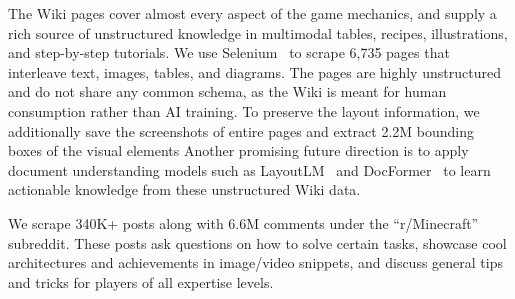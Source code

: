 The Wiki pages cover almost every aspect of the game mechanics, and supply a rich source of unstructured knowledge in multimodal tables, recipes, illustrations, and step-by-step tutorials. We use Selenium~\cite{selenium} to scrape 6,735 pages that interleave text, images, tables, and diagrams. The pages are highly unstructured and do not share any common schema, as the Wiki is meant for human consumption rather than AI training. To preserve the layout information, we additionally save the screenshots of entire pages and extract 2.2M bounding boxes of the visual elements  Another promising future direction is to apply document understanding models such as LayoutLM~\cite{xu2019layoutlm, xu2020layoutlmv2} and DocFormer~\cite{appalaraju2021docformer} to learn actionable knowledge from these unstructured Wiki data.

We scrape 340K+ posts along with 6.6M comments under the ``r/Minecraft'' subreddit. These posts ask questions on how to solve certain tasks, showcase cool architectures and achievements in image/video snippets, and discuss general tips and tricks for players of all expertise levels.
